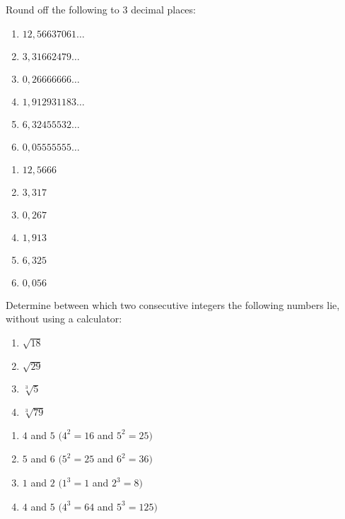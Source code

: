 \begin{exercises}{}
{
Round off the following to $3$ decimal places:
\begin{multicols}{2}
\begin{enumerate}[itemsep=3pt, label=\textbf{\arabic*}. ]
\item $12,56637061\ldots$ %
\item $3,31662479\ldots$ %
\item $0,26666666\ldots$ %
\item $1,912931183\ldots$ %
\item $6,32455532\ldots$ %
\item $0,05555555\ldots$ %
\end{enumerate}
\end{multicols}
}
\end{exercises}


 \begin{solutions}{}{
\begin{multicols}{2}
\begin{enumerate}[itemsep=0pt, label=\textbf{\arabic*}. ] 
 \item $12,5666$%
\item $3,317$%
\item $0,267$%
\item $1,913$
\item $6,325$%
\item $0,056$%
\end{enumerate}
\end{multicols}}
\end{solutions}


\begin{exercises}{}
 {
Determine between which two consecutive integers the following numbers lie, without using a calculator:
\begin{multicols}{2}
\begin{enumerate}[noitemsep, label=\textbf{\arabic*}. ]
\item $\sqrt{18}$
\item $\sqrt{29}$
\item $\sqrt[3]{5}$
\item $\sqrt[3]{79}$
\end{enumerate}
\end{multicols}
}
\end{exercises}

 \begin{solutions}{}{
\begin{multicols}{2}
\begin{enumerate}[noitemsep, label=\textbf{\arabic*}. ]
\item $4$ and $5$ $(4^2 = 16$ and $5^2=25)$%
\item $5$ and $6$ $(5^2 = 25$ and $6^2=36)$%
\item $1$ and $2$ $(1^3 = 1$ and $2^3=8)$%
\item $4$ and $5$ $(4^3 = 64$ and $5^3=125)$%
\end{enumerate}
\end{multicols}
}
\end{solutions}


